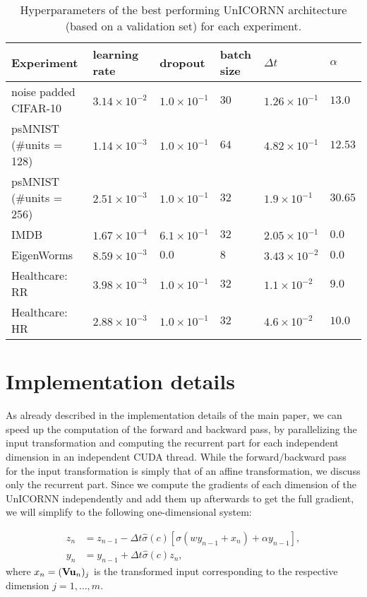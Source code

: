 \documentclass{article}
\newcommand{\bu}{{\bf u}}
\newcommand{\bV}{{\bf V}}
\newcommand{\Dt}{{\Delta t}}
\begin{document}
\begin{table}[h!]
  \caption{Hyperparameters of the best performing UnICORNN architecture (based on a validation set) for each experiment.}
  \label{tab:nets}
  \centering
  \begin{tabular}{llllll}
    \toprule
    \cmidrule(r){1-6}
    Experiment & learning rate & dropout & batch size & $\Dt$ & $\alpha$ \\
    \midrule
    noise padded CIFAR-10 & $3.14\times 10^{-2}$ & $1.0\times10^{-1}$ & $30$ & $ 1.26\times10^{-1}$ & $13.0$\\
    psMNIST (\#units = 128) & $1.14\times10^{-3}$ & $1.0\times10^{-1}$ & $64$& $4.82\times10^{-1}$ & $12.53$\\
    psMNIST (\#units = 256) & $2.51\times10^{-3}$ & $1.0\times10^{-1}$ & $32$ & $1.9\times10^{-1}$ & $30.65$ \\
    IMDB & $1.67\times10^{-4}$ & $6.1\times10^{-1}$ & $32$ & $2.05\times10^{-1}$ & $0.0$\\
    EigenWorms  & $8.59\times10^{-3}$ & $0.0$ & $8$ & $3.43\times10^{-2}$ & $0.0$ \\
    Healthcare: RR  & $3.98\times10^{-3}$ & $1.0\times10^{-1}$ & $32$ & $1.1\times10^{-2}$ & $9.0$ \\
    Healthcare: HR  &  $2.88\times10^{-3}$ & $1.0\times10^{-1}$ & $32$ & $4.6\times10^{-2}$ & $10.0$ \\
    

    \bottomrule
  \end{tabular}
\end{table}



\section{Implementation details}
As already described in the implementation details of the main paper, we can speed up the computation of the forward and backward pass, by parallelizing the input transformation and computing the recurrent part for each independent dimension in an independent CUDA thread. While the forward/backward pass for the input transformation is simply that of an affine transformation, we discuss only the recurrent part. Since we compute the gradients of each dimension of the UnICORNN independently and add them up afterwards to get the full gradient, we will simplify to the following one-dimensional system:

\begin{align*}
z_n &= z_{n-1} - \Dt\hat{\sigma}(c)[\sigma\left(wy_{n-1} + x_n \right) +\alpha y_{n-1}], \\
y_n &= y_{n-1} + \Dt\hat{\sigma}(c)z_n,
\end{align*}
where $x_n=(\bV \bu_n)_j$ is the transformed input corresponding to the respective dimension $j=1,\dots,m$.
\end{document}
